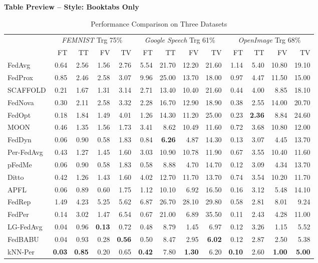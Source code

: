 \documentclass[conference]{IEEEtran}
\begin{document}
\onecolumn
\begin{center}
\Large\textbf{Table Preview -- Style: Booktabs Only}
\end{center}
\vspace{1em}
\begin{table}[t]
\centering
\caption{Performance Comparison on Three Datasets}
\label{tab:main-result}
\footnotesize

\begin{tabular}{lrrrrrrrrrrrr}
\toprule
 & \multicolumn{4}{c}{\textit{FEMNIST} Trg 75\%} & \multicolumn{4}{c}{\textit{Google Speech} Trg 61\%} & \multicolumn{4}{c}{\textit{OpenImage} Trg 68\%} \\
\cmidrule(lr){2-5} \cmidrule(lr){6-9} \cmidrule(lr){10-13}
 & FT & TT & FV & TV & FT & TT & FV & TV & FT & TT & FV & TV \\
\cmidrule(lr){2-5} \cmidrule(lr){6-9} \cmidrule(lr){10-13}
FedAvg & 0.64 & 2.56 & 1.56 & 2.76 & 5.54 & 21.70 & 12.20 & 21.60 & 1.14 & 5.40 & 10.80 & 19.10 \\
FedProx & 0.85 & 2.46 & 2.58 & 3.07 & 9.96 & 25.00 & 13.70 & 18.00 & 0.97 & 4.47 & 11.50 & 15.00 \\
SCAFFOLD & 0.21 & 1.67 & 1.31 & 3.14 & 2.71 & 13.40 & 10.40 & 21.60 & 0.44 & 4.00 & 8.85 & 18.10 \\
FedNova & 0.30 & 2.11 & 2.58 & 3.32 & 2.28 & 16.70 & 12.90 & 18.90 & 0.38 & 2.55 & 14.00 & 20.70 \\
FedOpt & 0.18 & 1.84 & 1.49 & 4.01 & 1.26 & 14.30 & 11.20 & 25.00 & 0.23 & \textbf{2.36} & 8.84 & 24.60 \\
MOON & 0.46 & 1.35 & 1.56 & 1.73 & 3.41 & 8.62 & 10.49 & 11.60 & 0.72 & 3.68 & 10.80 & 12.00 \\
FedDyn & 0.06 & 0.90 & 0.58 & 1.83 & 0.84 & \textbf{6.26} & 4.87 & 14.30 & 0.13 & 3.07 & 4.45 & 13.70 \\
Per-FedAvg & 0.43 & 1.27 & 1.45 & 1.60 & 3.03 & 10.90 & 10.78 & 11.90 & 0.67 & 3.55 & 10.40 & 11.60 \\
pFedMe & 0.06 & 0.90 & 0.58 & 1.83 & 0.58 & 8.88 & 4.70 & 14.70 & 0.12 & 3.09 & 4.34 & 13.70 \\
Ditto & 0.42 & 1.26 & 1.43 & 1.60 & 4.02 & 12.70 & 11.70 & 13.70 & 0.74 & 3.54 & 10.20 & 11.70 \\
APFL & 0.06 & 0.89 & 0.60 & 1.75 & 1.12 & 10.10 & 6.92 & 16.50 & 0.16 & 3.12 & 5.48 & 14.10 \\
FedRep & 1.49 & 4.23 & 5.25 & 5.62 & 6.87 & 26.70 & 28.10 & 29.80 & 0.58 & 2.81 & 8.01 & 9.24 \\
FedPer & 0.14 & 3.02 & 1.47 & 6.54 & 0.67 & 21.00 & 6.89 & 35.50 & 0.11 & 2.43 & 4.28 & 11.00 \\
LG-FedAvg & 0.04 & 0.96 & \textbf{0.13} & 0.72 & 0.48 & 8.79 & 1.45 & 6.97 & 0.12 & 3.26 & 1.15 & 5.52 \\
FedBABU & 0.04 & 0.93 & 0.28 & \textbf{0.56} & 0.50 & 8.47 & 2.95 & \textbf{6.02} & 0.12 & 2.87 & 2.50 & 5.38 \\
kNN-Per & \textbf{0.03} & \textbf{0.85} & 0.20 & 0.65 & \textbf{0.42} & 7.80 & \textbf{1.30} & 6.20 & \textbf{0.10} & 2.60 & \textbf{1.00} & \textbf{5.00} \\
\bottomrule
\end{tabular}
\end{table}
\end{document}
